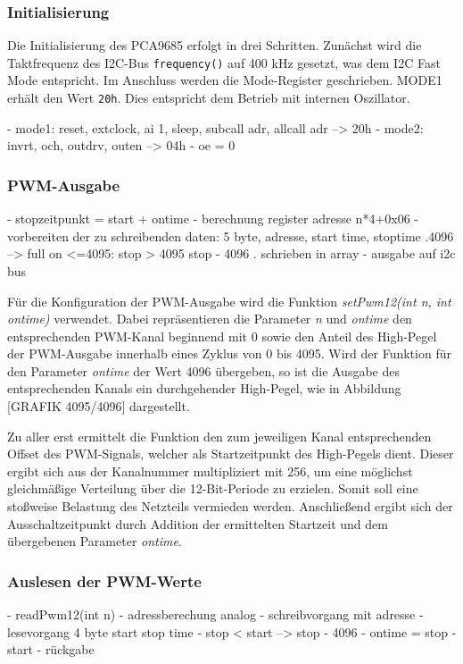\documentclass[a4paper,12pt]{scrartcl}
\begin{document}
\subsubsection{Initialisierung}
Die Initialisierung des PCA9685 erfolgt in drei Schritten. Zunächst wird die Taktfrequenz des I2C-Bus  \texttt{frequency()} auf 400 kHz gesetzt, was dem I2C Fast Mode entspricht. Im Anschluss werden die Mode-Register geschrieben. MODE1 erhält den Wert \texttt{20h}. Dies entspricht dem Betrieb mit internen Oszillator.

- mode1: reset, extclock, ai 1, sleep, subcall adr, allcall adr --> 20h
- mode2: invrt, och, outdrv, outen --> 04h
- oe = 0

\subsubsection{PWM-Ausgabe}
- stopzeitpunkt = start + ontime
- berechnung register adresse n*4+0x06
- vorbereiten der zu schreibenden daten: 5 byte, adresse, start time, stoptime
	.4096 --> full on <=4095: stop > 4095 stop - 4096
	. schrieben in array
- ausgabe auf i2c bus

Für die Konfiguration der PWM-Ausgabe wird die Funktion \textit{setPwm12(int n, int ontime)} verwendet. Dabei repräsentieren die Parameter \textit{n} und \textit{ontime} den entsprechenden PWM-Kanal beginnend mit 0 sowie den Anteil des High-Pegel der PWM-Ausgabe innerhalb eines Zyklus von 0 bis 4095. Wird der Funktion für den Parameter \textit{ontime} der Wert 4096 übergeben, so ist die Ausgabe des entsprechenden Kanals ein durchgehender High-Pegel, wie in Abbildung [GRAFIK 4095/4096] dargestellt.

Zu aller erst ermittelt die Funktion den zum jeweiligen Kanal entsprechenden Offset des PWM-Signals, welcher als Startzeitpunkt des High-Pegels dient. Dieser ergibt sich aus der Kanalnummer multipliziert mit 256, um eine möglichst gleichmäßige Verteilung über die 12-Bit-Periode zu erzielen. Somit soll eine stoßweise Belastung des Netzteils vermieden werden. Anschließend ergibt sich der Ausschaltzeitpunkt durch Addition der ermittelten Startzeit und dem übergebenen Parameter \textit{ontime}.



\subsubsection{Auslesen der PWM-Werte}
- readPwm12(int n)
- adressberechung analog
- schreibvorgang mit adresse
- lesevorgang 4 byte start stop time
- stop < start --> stop - 4096
- ontime = stop - start
- rückgabe
\end{document}
